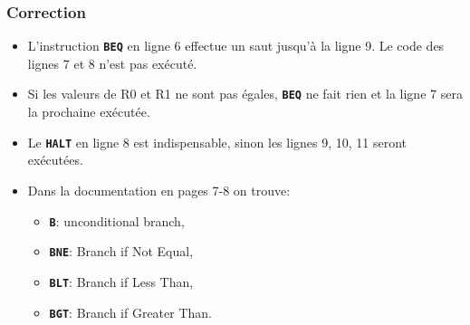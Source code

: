 \documentclass[svgnames,11pt]{beamer}
\begin{document}
\begin{frame}[fragile]
    \frametitle{Correction}

\begin{itemize}
    \item  L'instruction \textbf{\texttt{BEQ}} en ligne 6 effectue un saut jusqu'à la ligne 9. Le code des lignes 7 et 8 n'est pas exécuté.
    \item Si les valeurs de R0 et R1 ne sont pas égales, \textbf{\texttt{BEQ}} ne fait rien et la ligne 7 sera la prochaine exécutée.
    \item Le \textbf{\texttt{HALT}} en ligne 8 est indispensable, sinon les lignes 9, 10, 11 seront exécutées.
    \item Dans la documentation en pages 7-8 on trouve:
    \begin{itemize}
        \item \textbf{\texttt{B}}: unconditional branch,
        \item \textbf{\texttt{BNE}}: Branch if Not Equal,
        \item \textbf{\texttt{BLT}}: Branch if Less Than,
        \item \textbf{\texttt{BGT}}: Branch if Greater Than.
    \end{itemize}
\end{itemize}

\end{frame}
\end{document}
